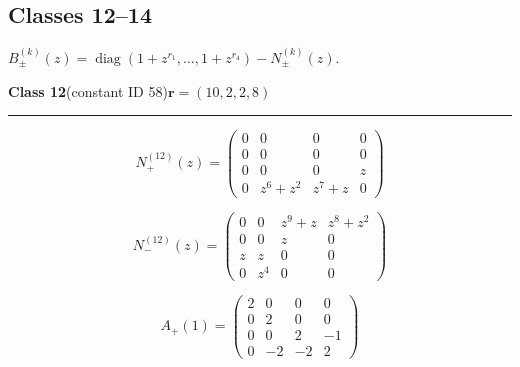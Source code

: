 \subsection*{Classes 12--14}
\noindent $B_\pm^{(k)}(z)=\operatorname{diag}(1+z^{r_1},\ldots,1+z^{r_4})-N_\pm^{(k)}(z)$.\par\medskip
\noindent\begin{minipage}{\linewidth}
\noindent\textbf{Class 12}\quad\small (constant ID 58)\hfill $\symbf{r}=(10,2,2,8)$
\par\smallskip\noindent\textcolor{rulegray}{\rule{\linewidth}{0.3pt}}
\begin{minipage}[c]{0.495\linewidth}\centering\fontsize{9.7}{12}\selectfont
\setlength{\abovedisplayskip}{4pt}\setlength{\belowdisplayskip}{4pt}
\setlength{\abovedisplayshortskip}{4pt}\setlength{\belowdisplayshortskip}{4pt}
\setlength{\arraycolsep}{3pt}\renewcommand{\arraystretch}{1.08}
\[N_{+}^{(12)}(z)=\begin{pmatrix}0 & 0 & 0 & 0\\0 & 0 & 0 & 0\\0 & 0 & 0 & z\\0 & z^{6} + z^{2} & z^{7} + z & 0\end{pmatrix}\]
\end{minipage}%
\begin{minipage}[c]{0.495\linewidth}\centering\fontsize{9.7}{12}\selectfont
\setlength{\abovedisplayskip}{4pt}\setlength{\belowdisplayskip}{4pt}
\setlength{\abovedisplayshortskip}{4pt}\setlength{\belowdisplayshortskip}{4pt}
\setlength{\arraycolsep}{3pt}\renewcommand{\arraystretch}{1.08}
\[N_{-}^{(12)}(z)=\begin{pmatrix}0 & 0 & z^{9} + z & z^{8} + z^{2}\\0 & 0 & z & 0\\z & z & 0 & 0\\0 & z^{4} & 0 & 0\end{pmatrix}\]
\end{minipage}%
\par\noindent
\begin{minipage}[c]{0.495\linewidth}\centering\fontsize{9.7}{12}\selectfont
\setlength{\abovedisplayskip}{4pt}\setlength{\belowdisplayskip}{4pt}
\setlength{\abovedisplayshortskip}{4pt}\setlength{\belowdisplayshortskip}{4pt}
\setlength{\arraycolsep}{3pt}\renewcommand{\arraystretch}{1.08}
\[A_{+}(1)=\begin{pmatrix}2 & 0 & 0 & 0\\0 & 2 & 0 & 0\\0 & 0 & 2 & -1\\0 & -2 & -2 & 2\end{pmatrix}\]

\end{minipage}
\end{minipage}

